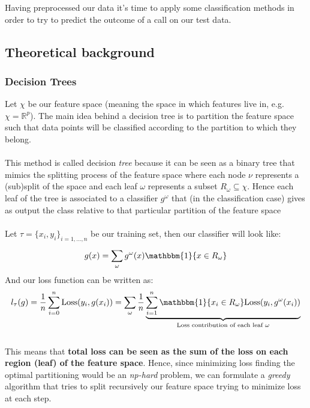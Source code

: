 Having preprocessed our data it's time to apply some classification methods in order to try to predict the outcome of a call on our test data.

\subsection{Theoretical background}
\subsubsection*{Decision Trees}
Let \(\chi\) be our feature space (meaning the space in which features live in, e.g. \(\chi = \mathbb{R}^p\)). The main idea behind a decision tree is to partition the feature space such that data points will be classified according to the partition to which they belong. \\
\\
This method is called decision \textit{tree} because it can be seen as a binary tree that mimics the splitting process of the feature space where each node \(\nu\) represents a (sub)split of the space and each leaf \(\omega\) represents a subset \(R_\omega \subseteq \chi\). Hence each leaf of the tree is associated to a classifier \(g^\omega\) that (in the classification case) gives as output the class relative to that particular partition of the feature space
\\
\\
Let \(\tau = \{x_i, y_i \}_{i = 1, \dots ,n}\) be our training set, then our classifier will look like:
\begin{equation}
    g(x) =  \sum \limits_{\omega}^{} g^\omega(x)\mathbbm{1}\{x \in R_\omega\}
\end{equation}
And our loss function can be written as:
\begin{equation}
    l_\tau(g) = \frac{1}{n}  \sum \limits_{i= 0}^{n}\text{Loss}(y_i, g(x_i)) =  \sum \limits_{\omega}^{} \frac{1}{n} \underbrace{\sum \limits_{i=1}^{n} \mathbbm{1}\{x_i  \in R_\omega \} \text{Loss}(y_i, g^\omega(x_i))}_{\text{Loss contribution of each leaf }\omega}
\end{equation}
\\
This means that \textbf{total loss can be seen as the sum of the loss on each region (leaf) of the feature space}. Hence, since minimizing loss finding the optimal partitioning would be an \textit{np-hard} problem, we can formulate a \textit{greedy} algorithm that tries to split recursively our feature space trying to minimize loss at each step.
\\
